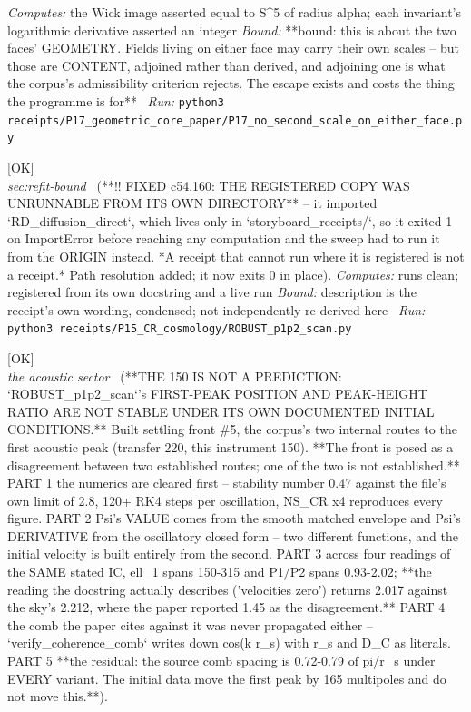 \begin{description}
\emph{Computes:} the Wick image asserted equal to S\textasciicircum{}5 of radius alpha; each invariant's logarithmic derivative asserted an integer
 \emph{Bound:} **bound: this is about the two faces' GEOMETRY. Fields living on either face may carry their own scales -- but those are CONTENT, adjoined rather than derived, and adjoining one is what the corpus's admissibility criterion rejects. The escape exists and costs the thing the programme is for**
\ \emph{Run:} \texttt{python3 receipts/P17\_geometric\_core\_paper/P17\_no\_second\_scale\_on\_either\_face.py}
\item[\label{rcpt:ROBUST_p1p2_scan}\texttt{ROBUST\_p1p2\_scan}]\hfill\textsf{[OK]}\\
\textit{sec:refit-bound} \ (**!! FIXED c54.160: THE REGISTERED COPY WAS UNRUNNABLE FROM ITS OWN DIRECTORY** -- it imported `RD\_diffusion\_direct`, which lives only in `storyboard\_receipts/`, so it exited 1 on ImportError before reaching any computation and the sweep had to run it from the ORIGIN instead. *A receipt that cannot run where it is registered is not a receipt.* Path resolution added; it now exits 0 in place). 
\emph{Computes:} runs clean; registered from its own docstring and a live run
 \emph{Bound:} description is the receipt's own wording, condensed; not independently re-derived here
\ \emph{Run:} \texttt{python3 receipts/P15\_CR\_cosmology/ROBUST\_p1p2\_scan.py}
\item[\label{rcpt:P15_the_first_peak_figure_is_not_stable}\texttt{P15\_the\_first\_peak\_figure\_is\_not\_stable}]\hfill\textsf{[OK]}\\
\textit{the acoustic sector} \ (**THE 150 IS NOT A PREDICTION: `ROBUST\_p1p2\_scan`'s FIRST-PEAK POSITION AND PEAK-HEIGHT RATIO ARE NOT STABLE UNDER ITS OWN DOCUMENTED INITIAL CONDITIONS.** Built settling front \#5, the corpus's two internal routes to the first acoustic peak (transfer 220, this instrument 150). **The front is posed as a disagreement between two established routes; one of the two is not established.** PART 1 the numerics are cleared first -- stability number 0.47 against the file's own limit of 2.8, 120+ RK4 steps per oscillation, NS\_CR x4 reproduces every figure. PART 2 Psi's VALUE comes from the smooth matched envelope and Psi's DERIVATIVE from the oscillatory closed form -- two different functions, and the initial velocity is built entirely from the second. PART 3 across four readings of the SAME stated IC, ell\_1 spans 150-315 and P1/P2 spans 0.93-2.02; **the reading the docstring actually describes ('velocities zero') returns 2.017 against the sky's 2.212, where the paper reported 1.45 as the disagreement.** PART 4 the comb the paper cites against it was never propagated either -- `verify\_coherence\_comb` writes down cos(k r\_s) with r\_s and D\_C as literals. PART 5 **the residual: the source comb spacing is 0.72-0.79 of pi/r\_s under EVERY variant. The initial data move the first peak by 165 multipoles and do not move this.**). 

\end{description}
